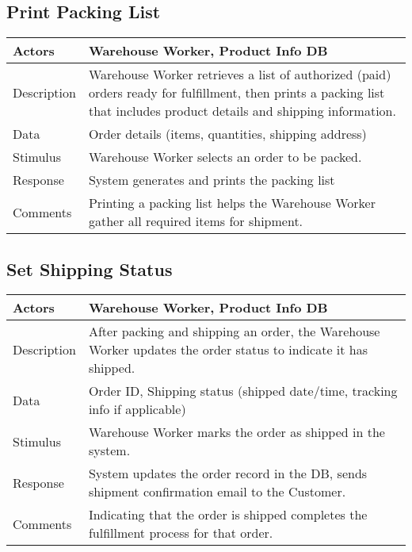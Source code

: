 \documentclass{report}
\begin{document}
    \pagebreak 
    \subsection{Print Packing List}
    \bigbreak \noindent 
    \begin{center}
        \begin{tabular}{|p{4cm}|p{8cm}|}
            \hline
            Actors & 
            Warehouse Worker, Product Info DB \\
            \hline
            Description & 
            Warehouse Worker retrieves a list of authorized (paid) orders 
            ready for fulfillment, then prints a packing list that 
            includes product details and shipping information. \\
            \hline
            Data & 
            Order details (items, quantities, shipping address) \\
            \hline
            Stimulus & 
            Warehouse Worker selects an order to be packed. \\
            \hline
            Response & 
            System generates and prints the packing list \\
            \hline
            Comments & 
            Printing a packing list helps the Warehouse Worker gather 
            all required items for shipment. \\
            \hline
        \end{tabular}
    \end{center}

    \pagebreak 
    \subsection{Set Shipping Status}
    \bigbreak \noindent 
    \begin{center}
        \begin{tabular}{|p{4cm}|p{8cm}|}
            \hline
            Actors & 
            Warehouse Worker, Product Info DB \\
            \hline
            Description & 
            After packing and shipping an order, the Warehouse Worker 
            updates the order status to indicate it has shipped. \\
            \hline
            Data & 
            Order ID, Shipping status (shipped date/time, tracking info if applicable) \\
            \hline
            Stimulus & 
            Warehouse Worker marks the order as shipped in the system. \\
            \hline
            Response & 
            System updates the order record in the DB, sends 
            shipment confirmation email to the Customer. \\
            \hline
            Comments & 
            Indicating that the order is shipped completes the fulfillment 
            process for that order. \\
            \hline
        \end{tabular}
    \end{center}
\end{document}
